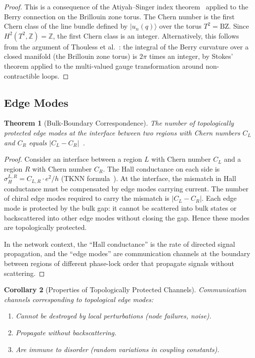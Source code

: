 \documentclass[11pt,twocolumn,a4paper]{article}
\newtheorem{theorem}{Theorem}[section]
\newtheorem{corollary}[theorem]{Corollary}
\theoremstyle{definition}
\newcommand{\Z}{\mathbb{Z}}
\begin{document}
\begin{proof}
This is a consequence of the Atiyah--Singer index theorem~\cite{atiyah1963} applied to
the Berry connection on the Brillouin zone torus. The Chern number is the first Chern
class of the line bundle defined by $|u_n(q)\rangle$ over the torus $T^2 = \mathrm{BZ}$.
Since $H^2(T^2, \Z) = \Z$, the first Chern class is an integer. Alternatively, this
follows from the argument of Thouless et al.~\cite{thouless1982}: the integral of the
Berry curvature over a closed manifold (the Brillouin zone torus) is $2\pi$ times an
integer, by Stokes' theorem applied to the multi-valued gauge transformation around
non-contractible loops.
\end{proof}

\subsection{Edge Modes}\label{sec:topo:edge}

\begin{theorem}[Bulk-Boundary Correspondence]\label{thm:bulk_boundary}
The number of topologically protected edge modes at the interface between two regions
with Chern numbers $C_L$ and $C_R$ equals $|C_L - C_R|$~\cite{hasan2010}.
\end{theorem}

\begin{proof}
Consider an interface between a region $L$ with Chern number $C_L$ and a region $R$ with
Chern number $C_R$. The Hall conductance on each side is $\sigma_H^{L,R} = C_{L,R} \cdot e^2/h$
(TKNN formula~\cite{thouless1982}). At the interface, the mismatch in Hall conductance
must be compensated by edge modes carrying current. The number of chiral edge modes
required to carry the mismatch is $|C_L - C_R|$. Each edge mode is protected by the
bulk gap: it cannot be scattered into bulk states or backscattered into other edge modes
without closing the gap. Hence these modes are topologically protected.

In the network context, the ``Hall conductance'' is the rate of directed signal
propagation, and the ``edge modes'' are communication channels at the boundary between
regions of different phase-lock order that propagate signals without scattering.
\end{proof}

\begin{corollary}[Properties of Topologically Protected Channels]\label{cor:topo_channels}
Communication channels corresponding to topological edge modes:
\begin{enumerate}[label=(\roman*)]
  \item Cannot be destroyed by local perturbations (node failures, noise).
  \item Propagate without backscattering.
  \item Are immune to disorder (random variations in coupling constants).
\end{enumerate}
\end{corollary}
\end{document}
